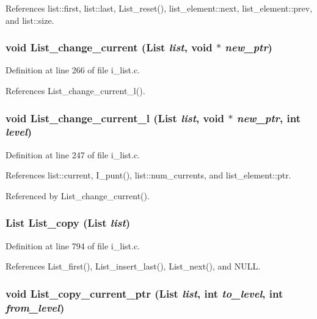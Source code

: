 References list::first, list::last, List\_\-reset(), list\_\-element::next, list\_\-element::prev, and list::size.
\subsubsection{\setlength{\rightskip}{0pt plus 5cm}void List\_\-change\_\-current (\bf{List} {\em list}, void $\ast$ {\em new\_\-ptr})}\label{i__list_8h_23fe1f21d2824722440364a8af9cdc97}




Definition at line 266 of file i\_\-list.c.

References List\_\-change\_\-current\_\-l().
\subsubsection{\setlength{\rightskip}{0pt plus 5cm}void List\_\-change\_\-current\_\-l (\bf{List} {\em list}, void $\ast$ {\em new\_\-ptr}, int {\em level})}\label{i__list_8h_d63e9aa3b9ab428f78542bd99c1c6bc8}




Definition at line 247 of file i\_\-list.c.

References list::current, I\_\-punt(), list::num\_\-currents, and list\_\-element::ptr.

Referenced by List\_\-change\_\-current().
\subsubsection{\setlength{\rightskip}{0pt plus 5cm}\bf{List} List\_\-copy (\bf{List} {\em list})}\label{i__list_8h_7f627f281d7c2a5b137970ab15ec683d}




Definition at line 794 of file i\_\-list.c.

References List\_\-first(), List\_\-insert\_\-last(), List\_\-next(), and NULL.
\subsubsection{\setlength{\rightskip}{0pt plus 5cm}void List\_\-copy\_\-current\_\-ptr (\bf{List} {\em list}, int {\em to\_\-level}, int {\em from\_\-level})}\label{i__list_8h_69d6726cd55b3135db23434991c97b02}




